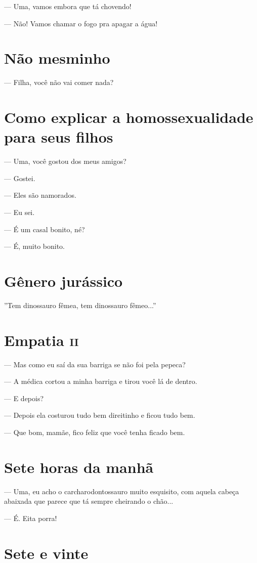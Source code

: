 {— Uma, vamos embora que tá chovendo!

— Não! Vamos chamar o fogo pra apagar a água!

\chapter{Não mesminho}

— Filha, você não vai comer nada?

\chapter{Como explicar a homossexualidade para seus filhos}

— Uma, você gostou dos meus amigos?

— Gostei.

— Eles são namorados.

— Eu sei.

— É um casal bonito, né?

— É, muito bonito.

\chapter{Gênero jurássico}

''Tem dinossauro fêmea, tem dinossauro fêmeo...''

\chapter{Empatia \textsc{ii}}

— Mas como eu saí da sua barriga se não foi pela pepeca?

— A médica cortou a minha barriga e tirou você lá de dentro.

— E depois?

— Depois ela costurou tudo bem direitinho e ficou tudo bem.

— Que bom, mamãe, fico feliz que você tenha ficado bem.

\chapter{Sete horas da manhã}

— Uma, eu acho o carcharodontossauro muito esquisito, com aquela cabeça
abaixada que parece que tá sempre cheirando o chão...

— É. Eita porra!

\chapter{Sete e vinte}

}
